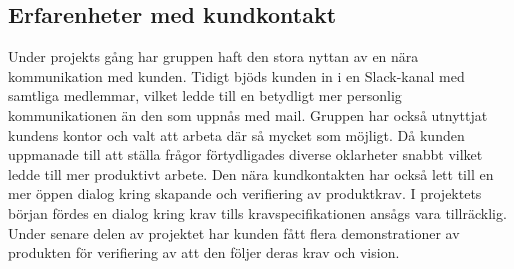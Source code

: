 \subsection{Erfarenheter med kundkontakt}
Under projekts gång har gruppen haft den stora nyttan av en nära kommunikation med kunden. Tidigt bjöds kunden in i en Slack-kanal med samtliga medlemmar, vilket ledde till en betydligt mer personlig kommunikationen än den som uppnås med mail. Gruppen har också utnyttjat kundens kontor och valt att arbeta där så mycket som möjligt. Då kunden uppmanade till att ställa frågor förtydligades diverse oklarheter snabbt vilket ledde till mer produktivt arbete. Den nära kundkontakten har också lett till en mer öppen dialog kring skapande och verifiering av produktkrav. I projektets början fördes en dialog kring krav tills kravspecifikationen ansågs vara tillräcklig. Under senare delen av projektet har kunden fått flera demonstrationer av produkten för verifiering av att den följer deras krav och vision.
